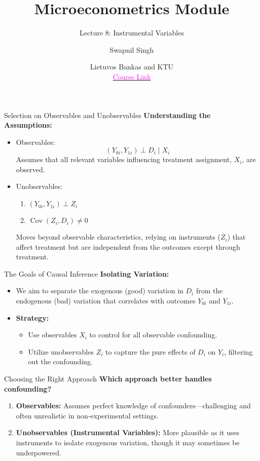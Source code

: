 \documentclass{beamer}
\title{Microeconometrics Module}
\subtitle{Lecture 8: Instrumental Variables}
\author{Swapnil Singh}
\date{Lietuvos Bankas and KTU \\ \href{https://github.com/swapnil1987/econometrics-2024}{\textcolor{magenta}{Course Link}}}
\theoremstyle{plain}
\begin{document}
	
	\maketitle
	
	\begin{frame}{Selection on Observables and Unobservables}
		\textbf{Understanding the Assumptions:}
		\begin{itemize}
			\item Observables:
			\[
			(Y_{0i}, Y_{1i}) \perp D_i \mid X_i
			\]
			Assumes that all relevant variables influencing treatment assignment, \(X_i\), are observed.
			
			\item Unobservables:
			\begin{enumerate}
				\item \((Y_{0i}, Y_{1i}) \perp Z_i\)
				\item \(\operatorname{Cov}(Z_i, D_i) \neq 0\)
			\end{enumerate}
			Moves beyond observable characteristics, relying on instruments (\(Z_i\)) that affect treatment but are independent from the outcomes except through treatment.
		\end{itemize}
	\end{frame}
	
	\begin{frame}{The Goals of Causal Inference}
		\textbf{Isolating Variation:}
		\begin{itemize}
			\item We aim to separate the exogenous (good) variation in \(D_i\) from the endogenous (bad) variation that correlates with outcomes \(Y_{0i}\) and \(Y_{1i}\).
			\item \textbf{Strategy:}
			\begin{itemize}
				\item Use observables \(X_i\) to control for all observable confounding.
				\item Utilize unobservables \(Z_i\) to capture the pure effects of \(D_i\) on \(Y_i\), filtering out the confounding.
			\end{itemize}
		\end{itemize}
	\end{frame}
	
	\begin{frame}{Choosing the Right Approach}
		\textbf{Which approach better handles confounding?}
		\begin{enumerate}
			\item \textbf{Observables:} Assumes perfect knowledge of confounders—challenging and often unrealistic in non-experimental settings.
			\item \textbf{Unobservables (Instrumental Variables):} More plausible as it uses instruments to isolate exogenous variation, though it may sometimes be underpowered.
		\end{enumerate}
	\end{frame}
	
\end{document}
